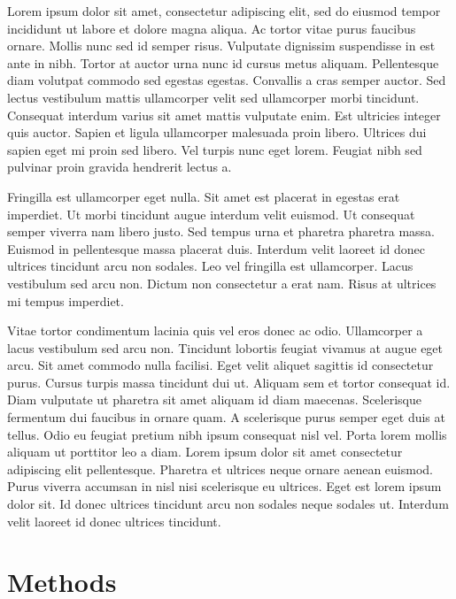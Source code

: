 \documentclass[11pt]{article}
\begin{document}
    Lorem ipsum dolor sit amet, consectetur adipiscing elit, sed do eiusmod tempor incididunt ut labore et dolore magna aliqua.
    Ac tortor vitae purus faucibus ornare.
    Mollis nunc sed id semper risus.
    Vulputate dignissim suspendisse in est ante in nibh.
    Tortor at auctor urna nunc id cursus metus aliquam.
    Pellentesque diam volutpat commodo sed egestas egestas.
    Convallis a cras semper auctor.
    Sed lectus vestibulum mattis ullamcorper velit sed ullamcorper morbi tincidunt.
    Consequat interdum varius sit amet mattis vulputate enim.
    Est ultricies integer quis auctor.
    Sapien et ligula ullamcorper malesuada proin libero.
    Ultrices dui sapien eget mi proin sed libero.
    Vel turpis nunc eget lorem.
    Feugiat nibh sed pulvinar proin gravida hendrerit lectus a.

    Fringilla est ullamcorper eget nulla.
    Sit amet est placerat in egestas erat imperdiet.
    Ut morbi tincidunt augue interdum velit euismod.
    Ut consequat semper viverra nam libero justo.
    Sed tempus urna et pharetra pharetra massa.
    Euismod in pellentesque massa placerat duis.
    Interdum velit laoreet id donec ultrices tincidunt arcu non sodales.
    Leo vel fringilla est ullamcorper.
    Lacus vestibulum sed arcu non.
    Dictum non consectetur a erat nam.
    Risus at ultrices mi tempus imperdiet.

    Vitae tortor condimentum lacinia quis vel eros donec ac odio.
    Ullamcorper a lacus vestibulum sed arcu non.
    Tincidunt lobortis feugiat vivamus at augue eget arcu.
    Sit amet commodo nulla facilisi.
    Eget velit aliquet sagittis id consectetur purus.
    Cursus turpis massa tincidunt dui ut.
    Aliquam sem et tortor consequat id.
    Diam vulputate ut pharetra sit amet aliquam id diam maecenas.
    Scelerisque fermentum dui faucibus in ornare quam.
    A scelerisque purus semper eget duis at tellus.
    Odio eu feugiat pretium nibh ipsum consequat nisl vel.
    Porta lorem mollis aliquam ut porttitor leo a diam.
    Lorem ipsum dolor sit amet consectetur adipiscing elit pellentesque.
    Pharetra et ultrices neque ornare aenean euismod.
    Purus viverra accumsan in nisl nisi scelerisque eu ultrices.
    Eget est lorem ipsum dolor sit.
    Id donec ultrices tincidunt arcu non sodales neque sodales ut.
    Interdum velit laoreet id donec ultrices tincidunt.

    \section{Methods}
    \label{sec:methods}
\end{document}
